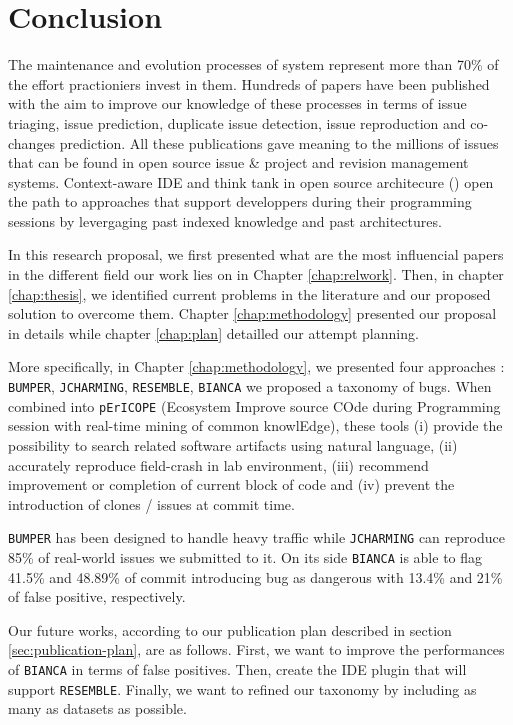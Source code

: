 
\chapter{Conclusion\label{chap:conclusion}}

The maintenance and evolution processes of system represent more than 70\% of the effort practioniers invest in them.
Hundreds of papers have been published with the aim to improve our knowledge of these processes in terms of issue triaging, issue prediction, duplicate issue detection, issue reproduction and co-changes prediction. 
All these publications gave meaning to the millions of issues that can be found in open source issue \& project and revision management systems. 
Context-aware IDE and think tank in open source architecure (\cite{chansler2011architecture}) open the path to approaches that support developpers during their programming sessions by levergaging past indexed knowledge and past architectures. 

In this research proposal, we first presented what are the most influencial papers in the different field our work lies on in Chapter \ref{chap:relwork}. 
Then, in chapter \ref{chap:thesis}, we identified current problems in the literature and our proposed solution to overcome them. 
Chapter \ref{chap:methodology} presented our proposal in details while chapter \ref{chap:plan} detailled our attempt planning.

More specifically, in Chapter \ref{chap:methodology}, we presented four approaches : {\tt BUMPER}, {\tt JCHARMING}, {\tt RESEMBLE}, {\tt BIANCA} we proposed a taxonomy of bugs. When combined into {\tt pErICOPE}  (Ecosystem Improve source COde during Programming session with real-time mining of common knowlEdge), these tools (i) provide the possibility to search related software artifacts using natural language, (ii) accurately reproduce field-crash in lab environment, (iii) recommend improvement or completion of current block of code and (iv) prevent the introduction of clones / issues at commit time. 


{\tt BUMPER} has been designed to handle heavy traffic while {\tt JCHARMING} can reproduce 85\% of real-world issues we submitted to it. On its side {\tt BIANCA} is able to flag 41.5\% and 48.89\% of commit introducing bug as dangerous with 13.4\% and 21\% of false positive, respectively. 

Our future works, according to our publication plan described in section \ref{sec:publication-plan}, are as follows. First, we want to improve the performances of {\tt BIANCA} in terms of false positives. 
Then, create the IDE plugin that will support {\tt RESEMBLE}. Finally, we want to refined our taxonomy by including as many as datasets as possible.






